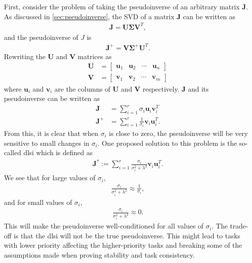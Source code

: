 First, consider the problem of taking the pseudoinverse of an arbitrary matrix $\bm{J}$.
As discussed in \autoref{sec:pseudoinverse}, the SVD of a matrix $\bm{J}$ can be
written as
\begin{align}
    \bm{J} = \bm{U} \bm{\Sigma} \bm{V}^T,
\end{align}
and the pseudoinverse of $J$ is
\begin{align}
    \bm{J}^+ = \bm{V} \bm{\Sigma}^+ \bm{U}^T.
\end{align}
Rewriting the $\bm{U}$ and $\bm{V}$ matrices as
\begin{subequations}
\begin{align}
    \bm{U} &= \begin{bmatrix} \bm{u}_1 & \bm{u}_2 & \cdots & \bm{u}_n \end{bmatrix} \\
    \bm{V} &= \begin{bmatrix} \bm{v}_1 & \bm{v}_2 & \cdots & \bm{v}_m \end{bmatrix}
\end{align}
\end{subequations}
where $\bm{u}_i$ and $\bm{v}_i$ are the columns of $\bm{U}$ and $\bm{V}$ respectively.
$\bm{J}$ and its pseudoinverse can be written as
\begin{subequations}
\begin{align}
    \bm{J} &= \sum_{i=1}^r \sigma_i \bm{u}_i \bm{v}_i^T \\
    \bm{J}^+ &= \sum_{i=1}^r \frac{1}{\sigma_i} \bm{v}_i \bm{u}_i^T.
\end{align}
\end{subequations}
From this, it is clear that when $\sigma_i$ is close to zero, the pseudoinverse
will be very sensitive to small changes in $\sigma_i$. One proposed solution to
this problem is the so-called \gls{dlsi} which is defined as
\begin{align}
    \bm{J}^* := \sum_{i=1}^r \frac{\sigma_i}{\sigma_i^2 + \lambda^2} \bm{v}_i \bm{u}_i^T.
\end{align}
We see that for large values of $\sigma_i$,
\begin{align}
    \frac{\sigma_i}{\sigma_i^2 + \lambda^2} \approx \frac{1}{\sigma_i},
\end{align}
and for small values of $\sigma_i$,
\begin{align}
    \frac{\sigma_i}{\sigma_i^2 + \lambda^2} \approx 0.
\end{align}
This will make the pseudoinverse well-conditioned for all values of $\sigma_i$.
The trade-off is that the \gls{dlsi} will not be the true pseudoinverse.
This might lead to tasks with lower priority affecting the higher-priority tasks and
breaking some of the assumptions made when proving stability and task consistency.

